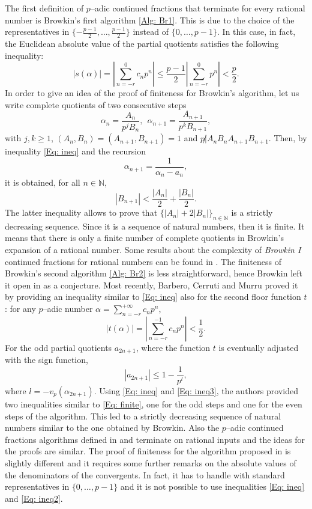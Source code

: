 \documentclass[12pt, reqno]{amsart}
\theoremstyle{plain}
\theoremstyle{definition}
\begin{document}
The first definition of $p$--adic continued fractions that terminate for every rational number is Browkin's first algorithm \eqref{Alg: Br1}. This is due to the choice of the representatives in $\{-\frac{p-1}{2},\ldots,\frac{p-1}{2}\}$ instead of $\{0,\ldots,p-1\}$. In this case, in fact, the Euclidean absolute value of the partial quotients satisfies the following inequality:
\begin{equation}\label{Eq: ineq}
|s(\alpha)|=\left|\sum\limits_{n=-r}^{0}c_np^n\right|\leq \frac{p-1}{2}\left|\sum\limits_{n=-r}^{0}p^n\right|<\frac{p}{2}.
\end{equation}
In order to give an idea of the proof of finiteness for Browkin's algorithm, let us write complete quotients of two consecutive steps
\[\alpha_n=\frac{A_n}{p^jB_n}, \ \ \alpha_{n+1}=\frac{A_{n+1}}{p^kB_{n+1}},\]
with $j,k\geq 1$, $(A_n,B_n)=(A_{n+1},B_{n+1})=1$ and $p\not|A_nB_nA_{n+1}B_{n+1}$. Then, by inequality \eqref{Eq: ineq} and the recursion
\[\alpha_{n+1}=\frac{1}{\alpha_n-a_n},\]
it is obtained, for all $n\in\mathbb{N}$,
\begin{equation}\label{Eq: finite}
|B_{n+1}|< \frac{|A_n|}{2}+\frac{|B_n|}{2}.
\end{equation}
The latter inequality allows to prove that $\{|A_n|+2|B_n|\}_{n\in\mathbb{N}}$ is a strictly decreasing sequence. Since it is a sequence of natural numbers, then it is finite. It means that there is only a finite number of complete quotients in Browkin's expansion of a rational number. Some results about the complexity of \textit{Browkin I} continued fractions for rational numbers can be found in \cite{BELE}. The finiteness of Browkin's second algorithm \eqref{Alg: Br2} is less straightforward, hence Browkin left it open in \cite{BII} as a conjecture. Most recently, Barbero, Cerruti and Murru \cite{BCMI} proved it by providing an inequality similar to \eqref{Eq: ineq} also for the second floor function $t$: for any $p$--adic number $\alpha=\sum\limits_{n=-r}^{+\infty}c_np^n$,
\begin{equation}\label{Eq: ineq2}
\left|t(\alpha)\right|=\left|\sum\limits_{n=-r}^{-1}c_np^n\right|<\frac{1}{2}.
\end{equation}
For the odd partial quotients $a_{2n+1}$, where the function $t$ is eventually adjusted with the sign function,
\begin{equation}\label{Eq: ineq3}
\left|a_{2n+1}\right|\leq 1-\frac{1}{p^l},
\end{equation}
where $l=-v_p(\alpha_{2n+1})$. Using \eqref{Eq: ineq} and \eqref{Eq: ineq3}, the authors provided two inequalities similar to \eqref{Eq: finite}, one for the odd steps and one for the even steps of the algorithm. This led to a strictly decreasing sequence of natural numbers similar to the one obtained by Browkin. Also the $p$--adic continued fractions algorithms defined in \cite{MR} and \cite{MRSII} terminate on rational inputs and the ideas for the proofs are similar. The proof of finiteness for the algorithm proposed in \cite{BCMII} is slightly different and it requires some further remarks on the absolute values of the denominators of the convergents. In fact, it has to handle with standard representatives in $\{0,\ldots,p-1\}$ and it is not possible to use inequalities \eqref{Eq: ineq} and \eqref{Eq: ineq2}.
\end{document}
